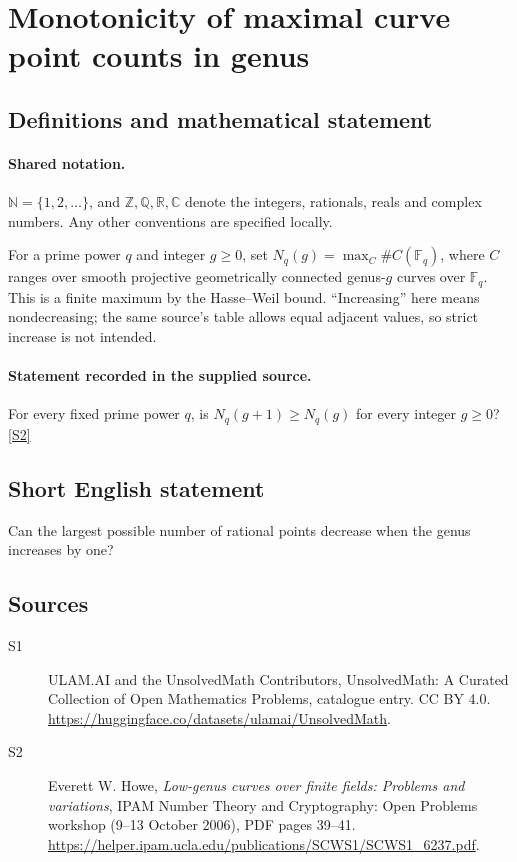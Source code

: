 \documentclass[11pt]{article}
\newcommand{\sref}[2]{\hyperlink{source:#1:#2}{[S#2]}}
\begin{document}
\section{Monotonicity of maximal curve point counts in genus}\label{statement}

\subsection{Definitions and mathematical statement}

\paragraph{Shared notation.}$\mathbb N=\{1,2,\ldots\}$, and $\mathbb Z,\mathbb Q,\mathbb R,\mathbb C$ denote the integers, rationals, reals and complex numbers. Any other conventions are specified locally.


For a prime power $q$ and integer $g\ge0$, set $N_q(g)=\max_C\#C(\mathbb F_q)$, where $C$ ranges over smooth projective geometrically connected genus-$g$ curves over $\mathbb F_q$. This is a finite maximum by the Hasse--Weil bound. ``Increasing'' here means nondecreasing; the same source's table allows equal adjacent values, so strict increase is not intended.
\paragraph{Statement recorded in the supplied source.}
For every fixed prime power $q$, is $N_q(g+1)\ge N_q(g)$ for every integer $g\ge0$? \sref{statement}{2}

\subsection{Short English statement}
Can the largest possible number of rational points decrease when the genus increases by one?
\subsection{Sources}
\begin{description}
\item[\hypertarget{source:statement:1}{S1}] ULAM.AI and the UnsolvedMath Contributors, UnsolvedMath: A Curated Collection of Open Mathematics Problems, catalogue entry. CC BY 4.0. \url{https://huggingface.co/datasets/ulamai/UnsolvedMath}.
\item[\hypertarget{source:statement:2}{S2}] Everett W. Howe, \emph{Low-genus curves over finite fields: Problems and variations}, IPAM Number Theory and Cryptography: Open Problems workshop (9--13 October 2006), PDF pages 39--41. \url{https://helper.ipam.ucla.edu/publications/SCWS1/SCWS1_6237.pdf}.
\end{description}
\label{end:statement}
\end{document}
